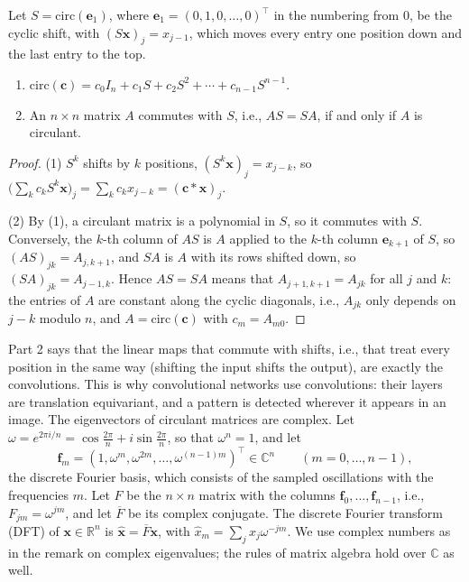 Let $S = \mathrm{circ}(\mathbf{e}_1)$, where $\mathbf{e}_1 = (0, 1, 0, \ldots, 0)^\top$ in the numbering from $0$, be the cyclic shift, with $(S\mathbf{x})_j = x_{j-1}$, which moves every entry one position down and the last entry to the top.

\begin{proposition}\label{L1-prop:circulant-shift}
    \begin{enumerate}
        \item $\mathrm{circ}(\mathbf{c}) = c_0I_n + c_1S + c_2S^2 + \cdots + c_{n-1}S^{n-1}$.
        \item An $n \times n$ matrix $A$ commutes with $S$, i.e., $AS = SA$, if and only if $A$ is circulant.
    \end{enumerate}
\end{proposition}

\begin{proof}
    (1) $S^k$ shifts by $k$ positions, $(S^k\mathbf{x})_j = x_{j-k}$, so $\big(\sum_k c_kS^k\mathbf{x}\big)_j = \sum_k c_kx_{j-k} = (\mathbf{c} \ast \mathbf{x})_j$.

    (2) By (1), a circulant matrix is a polynomial in $S$, so it commutes with $S$. Conversely, the $k$-th column of $AS$ is $A$ applied to the $k$-th column $\mathbf{e}_{k+1}$ of $S$, so $(AS)_{jk} = A_{j,k+1}$, and $SA$ is $A$ with its rows shifted down, so $(SA)_{jk} = A_{j-1,k}$. Hence $AS = SA$ means that $A_{j+1,k+1} = A_{jk}$ for all $j$ and $k$: the entries of $A$ are constant along the cyclic diagonals, i.e., $A_{jk}$ only depends on $j - k$ modulo $n$, and $A = \mathrm{circ}(\mathbf{c})$ with $c_m = A_{m0}$.
\end{proof}

Part 2 says that the linear maps that commute with shifts, i.e., that treat every position in the same way (shifting the input shifts the output), are exactly the convolutions. This is why convolutional networks use convolutions: their layers are translation equivariant, and a pattern is detected wherever it appears in an image. The eigenvectors of circulant matrices are complex. Let $\omega = e^{2\pi i/n} = \cos\frac{2\pi}{n} + i\sin\frac{2\pi}{n}$, so that $\omega^n = 1$, and let
\[\mathbf{f}_m = (1, \omega^m, \omega^{2m}, \ldots, \omega^{(n-1)m})^\top \in \mathbb{C}^n \qquad (m = 0, \ldots, n - 1),\]
the discrete Fourier basis, which consists of the sampled oscillations with the frequencies $m$. Let $F$ be the $n \times n$ matrix with the columns $\mathbf{f}_0, \ldots, \mathbf{f}_{n-1}$, i.e., $F_{jm} = \omega^{jm}$, and let $\overline{F}$ be its complex conjugate. The discrete Fourier transform (DFT) of $\mathbf{x} \in \mathbb{R}^n$ is $\hat{\mathbf{x}} = \overline{F}\mathbf{x}$, with $\hat{x}_m = \sum_j x_j\omega^{-jm}$. We use complex numbers as in the remark on complex eigenvalues; the rules of matrix algebra hold over $\mathbb{C}$ as well.


